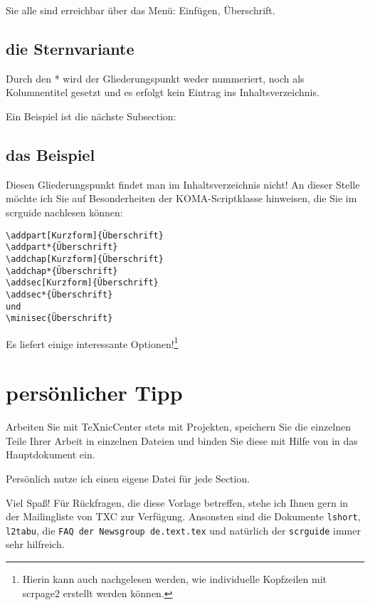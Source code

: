 \documentclass[a4paper,%
twoside,							%
headsepline=true,					%
footsepline=true,					%
headings=normal,
listof=totoc,					%
bibliography=totoc			%
]
{scrartcl}
\begin{document}
Sie alle sind erreichbar über das Menü: Einfügen, Überschrift.

\subsection{die Sternvariante}
Durch den * wird der Gliederungspunkt weder nummeriert, noch als Kolumnentitel gesetzt und es erfolgt kein Eintrag
ins Inhaltsverzeichnis.

Ein Beispiel ist die nächste Subsection:

\subsection*{das Beispiel}
Diesen Gliederungspunkt findet man im Inhaltsverzeichnis nicht!
An dieser Stelle möchte ich Sie auf Besonderheiten der KOMA-Scriptklasse hinweisen, die Sie im scrguide nachlesen können:
\begin{verbatim}
\addpart[Kurzform]{Überschrift}
\addpart*{Überschrift}
\addchap[Kurzform]{Überschrift}
\addchap*{Überschrift}
\addsec[Kurzform]{Überschrift}
\addsec*{Überschrift}
und
\minisec{Überschrift}
\end{verbatim}
Es liefert einige interessante Optionen!\footnote{Hierin kann auch nachgelesen werden, wie individuelle Kopfzeilen mit scrpage2 erstellt werden können.}

\section{persönlicher Tipp}
Arbeiten Sie mit TeXnicCenter stets mit Projekten, speichern Sie die einzelnen Teile Ihrer Arbeit in einzelnen Dateien und binden Sie diese mit Hilfe von \verb## in das Hauptdokument ein.

Persönlich nutze ich einen eigene Datei für jede Section. 

Viel Spaß! Für Rückfragen, die diese Vorlage betreffen, stehe ich Ihnen gern in der Mailingliste von TXC zur Verfügung. Ansonsten sind die Dokumente \texttt{lshort}, \texttt{l2tabu}, die \texttt{FAQ der Newsgroup de.text.tex} und natürlich der \texttt{scrguide} immer sehr hilfreich.

%
\newpage
{}
\renewcommand{\refname}{Quellenverzeichnis}
%
\end{document}
